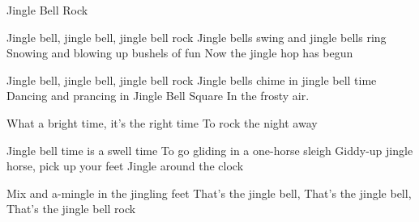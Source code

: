 \begin{sang}{Jingle Bell Rock}{}
\begin{vers}
Jingle bell, jingle bell, jingle bell rock
Jingle bells swing and jingle bells ring			
Snowing and blowing up bushels of fun
Now the jingle hop has begun
\end{vers}
\begin{vers}						
Jingle bell, jingle bell, jingle bell rock
Jingle bells chime in jingle bell time
Dancing and prancing in Jingle Bell Square
In the frosty air.
\end{vers}
\begin{vers}	
What a bright time, it's the right time
To rock the night away
\end{vers}
\begin{vers}						
Jingle bell time is a swell time
To go gliding in a one-horse sleigh
Giddy-up jingle horse, pick up your feet
Jingle around the clock
\end{vers}
\begin{vers}
Mix and a-mingle in the jingling feet
That's the jingle bell,
That's the jingle bell,
That's the jingle bell rock
\end{vers}
\vbox{}\vfill
\vbox{}\vfill
\laps
\end{sang}